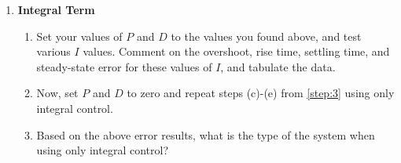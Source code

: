 \begin{enumerate}
    \item \textbf{Integral Term}\label{step:5} \begin{enumerate}
              \item Set your values of \(P\) and \(D\) to the values you found above, and test various \(I\) values.  Comment on the overshoot,
                    rise time, settling time, and steady-state error for these values of
                    \(I\), and tabulate the data.

              \item Now, set \(P\) and
                    \(D\) to zero and repeat steps (c)-(e) from \ref{step:3} using only integral control.
              \item Based on the above error results, what is the type of the system when using only integral control?
          \end{enumerate}


\end{enumerate}
